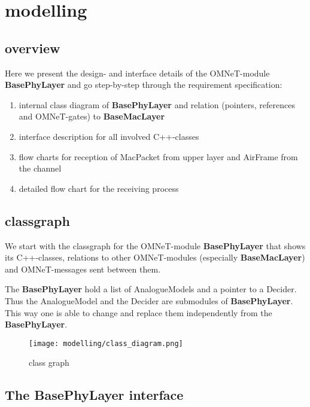 \newcommand{\h}[1]{\textbf{#1}}
\newcommand{\basePhyLayer}{BasePhyLayer}
\newcommand{\baseMacLayer}{BaseMacLayer}


\section{modelling}

\subsection{overview}

Here we present the design- and interface details of the OMNeT-module \h{\basePhyLayer} and go step-by-step through the requirement specification:

\begin{enumerate}
 \item internal class diagram of \h{\basePhyLayer} and relation (pointers, references and OMNeT-gates) to \h{\baseMacLayer}
 \item interface description for all involved \textsf{C++}-classes
 \item flow charts for reception of MacPacket from upper layer and AirFrame from the channel
 \item detailed flow chart for the receiving process
\end{enumerate}

\subsection{classgraph}

We start with the classgraph for the OMNeT-module \h{\basePhyLayer} that shows its
\textsf{C++}-classes, relations to other OMNeT-modules (especially \h{\baseMacLayer})
and OMNeT-messages sent between them.

The \h{\basePhyLayer} hold a list of AnalogueModels and a pointer to a Decider. Thus the AnalogueModel and the Decider are submodules of \h{\basePhyLayer}. This way one is able to change and replace them independently from the \h{\basePhyLayer}.

\begin{figure}[H]
 \centering
 \texttt{[image: modelling/class\_diagram.png]}
 \caption{class graph}
 \label{fig: classgraph}
\end{figure}
\newpage

\subsection{The \h{\basePhyLayer} interface}

